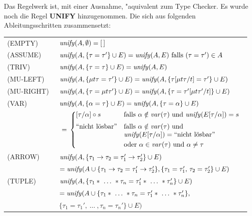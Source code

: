 Das Regelwerk ist, mit einer Ausnahme, "aquivalent zum Type Checker. Es wurde 
noch die Regel {\bf UNIFY} hinzugenommen. Die sich aus folgenden Ableitungsschritten
zusammensetzt:\\[4mm] 

\begin{tabular}{ll}
  (EMPTY)\    & ${\text{\it unify\/}}(A,\emptyset) = [\,]$ \\[3mm]
  (ASSUME)\   & ${\text{\it unify\/}}(A,\{\tau = \tau'\} \cup E) = {\text{\it unify\/}}(A,E) \mbox{  falls } (\tau = \tau') \in A $\\[3mm]
  (TRIV)\     & ${\text{\it unify\/}}(A,\{\tau = \tau\} \cup E) = {\text{\it unify\/}}(A,E)$\\[3mm]
  (MU-LEFT)\  & ${\text{\it unify\/}}(A,\{\textbf{$\mu$} t\tau = \tau'\} \cup E) = 
                 {\text{\it unify\/}}(A,\{\tau [\textbf{$\mu$} t\tau/t] = \tau'\} \cup E)$\\[3mm]
  (MU-RIGHT)\ & ${\text{\it unify\/}}(A,\{\tau = \textbf{$\mu$} t\tau'\} \cup E) = 
                 {\text{\it unify\/}}(A,\{\tau = \tau' [\textbf{$\mu$} t\tau'/t]\} \cup E)$\\[3mm]
  (VAR)\      & ${\text{\it unify\/}}(A,\{\alpha = \tau\} \cup E) = {\text{\it unify\/}}(A,\{\tau = \alpha\} \cup E)$\\[2mm]
              & $\ =\, \bcase 
                        [\tau/\alpha] \circ s & 
                        \mbox{falls } \alpha \notin \var{\tau} \mbox{ und } 
                        \unify(E[\tau/\alpha]) = s \\[2mm]
                        \fail         & \mbox{falls } \alpha \notin \var{\tau} \mbox{ und }\\&
                        \unify(E[\tau/\alpha]) = \fail\\[1mm]
                        & \mbox{oder } \alpha \in \var{\tau} \mbox{ und } \alpha \neq \tau
                        \ecase\vspace{3mm}$\\
  (ARROW)\    & ${\text{\it unify\/}}(A,\{\tau_1 \to \tau_2 = \tau'_1 \to \tau'_2\} \cup E)$\\[1mm]
              & \quad $= {\text{\it unify\/}}(A \cup \{\tau_1 \to \tau_2 = \tau'_1 \to \tau'_2\},
                \{\tau_1 = \tau'_1,\,\tau_2 = \tau'_2\} \cup E)$\\[3mm]
  (TUPLE)\    & $\unify(A,\{\tau_1 *\ \ldots\ * \tau_n = \tau_1' *\ \ldots\ * \tau_n'\} \cup E)$\\[1mm]
              & \quad $= {\text{\it unify\/}}(A \cup \{\tau_1 *\ \ldots\ * \tau_n = \tau_1' *\ \ldots\ * \tau_n'\},$\\
              & \quad \quad $\{\tau_1 = \tau_1',\ \ldots\ , \tau_n = \tau_n'\} \cup E)$\\[3mm]

\end{tabular}
